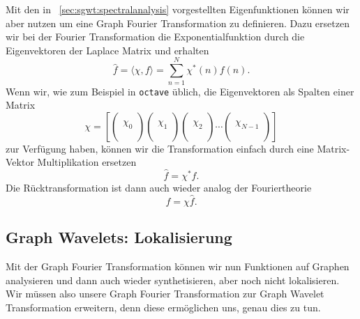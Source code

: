 Mit den in ~\cref{sec:sgwt:spectralanalysis} vorgestellten Eigenfunktionen 
k\"onnen wir aber nutzen um eine Graph Fourier Transformation zu definieren. 
Dazu ersetzen wir bei der Fourier Transformation die Exponentialfunktion durch 
die Eigenvektoren der Laplace Matrix und erhalten
\begin{equation*}
\hat{f} = \langle \chi, f \rangle = \sum_{n = 1}^{N} \chi^*(n)f(n).
\end{equation*}
Wenn wir, wie zum Beispiel in \texttt{octave} \"ublich, die Eigenvektoren als 
Spalten einer Matrix
\begin{equation}
\chi = 
\left[
\begin{pmatrix}\\\chi_0\\\\\end{pmatrix}
\begin{pmatrix}\\\chi_1\\\\\end{pmatrix}
\begin{pmatrix}\\\chi_2\\\\\end{pmatrix}
\cdots
\begin{pmatrix}\\\chi_{N-1}\\\\\end{pmatrix}
\right]
\end{equation}
zur Verf\"ugung haben, k\"onnen wir die Transformation 
einfach durch eine Matrix-Vektor Multiplikation ersetzen
\begin{equation*}
\hat{f} = \chi^* f.
\end{equation*}
Die R\"ucktransformation ist dann auch wieder analog der Fouriertheorie
\begin{equation*}
f = \chi \hat{f}.
\end{equation*}

\subsection{Graph Wavelets: Lokalisierung\label{subsec:sgwt:gwt:localizing}}

Mit der Graph Fourier Transformation k\"onnen wir nun Funktionen auf Graphen 
analysieren und dann auch wieder synthetisieren, aber noch nicht 
lokalisieren. Wir m\"ussen also unsere Graph Fourier Transformation zur Graph 
Wavelet Transformation erweitern, denn diese erm\"oglichen uns, genau dies zu 
tun.

